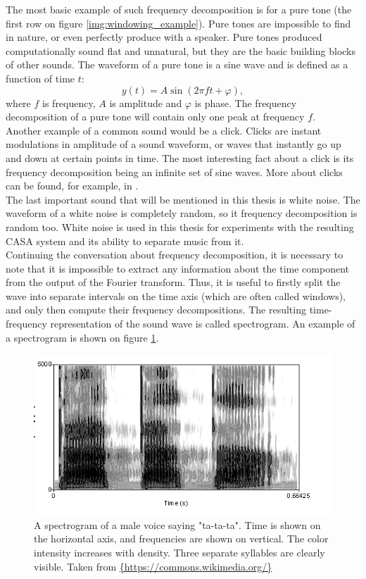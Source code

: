 The most basic example of such frequency decomposition is for a pure tone (the first row on figure \ref{img:windowing_example}). Pure tones are impossible to find in nature, or even perfectly produce with a speaker. Pure tones produced computationally sound flat and unnatural, but they are the basic building blocks of other sounds. The waveform of a pure tone is a sine wave and is defined as a function of time $t$: $$y(t) = A\sin(2\pi{}ft + \varphi),$$ where $f$ is frequency, $A$ is amplitude and $\varphi$ is phase. The frequency decomposition of a pure tone will contain only one peak at frequency $f$.\\

Another example of a common sound would be a click. Clicks are instant modulations in amplitude of a sound waveform, or waves that instantly go up and down at certain points in time. The most interesting fact about a click is its frequency decomposition being an infinite set of sine waves. More about clicks can be found, for example, in \cite{Schnupp2011}.\\

The last important sound that will be mentioned in this thesis is white noise. The waveform of a white noise is completely random, so it frequency decomposition is random too. White noise is used in this thesis for experiments with the resulting CASA system and its ability to separate music from it.\\

Continuing the conversation about frequency decomposition, it is necessary to note that it is impossible to extract any information about the time component from the output of the Fourier transform. Thus, it is useful to firstly split the wave into separate intervals on the time axis (which are often called windows), and only then compute their frequency decompositions. The resulting time-frequency representation of the sound wave is called spectrogram. An example of a spectrogram is shown on figure \ref{img:spectrogram_example}.

\begin{figure}[h]
	\centering
	\includegraphics[height=0.3\textheight]{include/spectrogram_example}
	\caption[An example of a spectrogram]{A spectrogram of a male voice saying "ta-ta-ta". Time is shown on the horizontal axis, and frequencies are shown on vertical. The color intensity increases with density. Three separate syllables are clearly visible. Taken from \url{{https://commons.wikimedia.org/}}}
	\label{img:spectrogram_example}
\end{figure}

